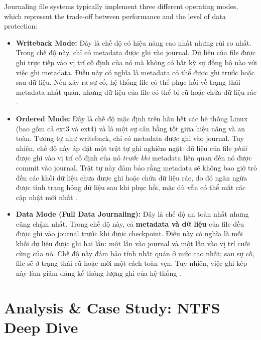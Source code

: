 \documentclass[12pt]{article}
\begin{document}
Journaling file systems typically implement three different operating modes, which represent the trade-off between performance and the level of data protection:

\begin{itemize}
    \item \textbf{Writeback Mode:} Đây là chế độ có hiệu năng cao nhất nhưng rủi ro nhất. Trong chế độ này, chỉ có metadata được ghi vào journal. Dữ liệu của file được ghi trực tiếp vào vị trí cố định của nó mà không có bất kỳ sự đồng bộ nào với việc ghi metadata. Điều này có nghĩa là metadata có thể được ghi trước hoặc sau dữ liệu. Nếu xảy ra sự cố, hệ thống file có thể phục hồi về trạng thái metadata nhất quán, nhưng dữ liệu của file có thể bị cũ hoặc chứa dữ liệu rác \parencite{Jones2008Anatomy}.

    \item \textbf{Ordered Mode:} Đây là chế độ mặc định trên hầu hết các hệ thống Linux (bao gồm cả ext3 và ext4) và là một sự cân bằng tốt giữa hiệu năng và an toàn. Tương tự như writeback, chỉ có metadata được ghi vào journal. Tuy nhiên, chế độ này áp đặt một trật tự ghi nghiêm ngặt: dữ liệu của file \textit{phải} được ghi vào vị trí cố định của nó \textit{trước khi} metadata liên quan đến nó được commit vào journal. Trật tự này đảm bảo rằng metadata sẽ không bao giờ trỏ đến các khối dữ liệu chưa được ghi hoặc chứa dữ liệu rác, do đó ngăn ngừa được tình trạng hỏng dữ liệu sau khi phục hồi, mặc dù vẫn có thể mất các cập nhật mới nhất \parencite{Prabhakaran2005journaling}.

    \item \textbf{Data Mode (Full Data Journaling):} Đây là chế độ an toàn nhất nhưng cũng chậm nhất. Trong chế độ này, cả \textbf{metadata và dữ liệu} của file đều được ghi vào journal trước khi được checkpoint. Điều này có nghĩa là mỗi khối dữ liệu được ghi hai lần: một lần vào journal và một lần vào vị trí cuối cùng của nó. Chế độ này đảm bảo tính nhất quán ở mức cao nhất; sau sự cố, file sẽ ở trạng thái cũ hoặc mới một cách toàn vẹn. Tuy nhiên, việc ghi kép này làm giảm đáng kể thông lượng ghi của hệ thống \parencite{Jones2008Anatomy}.
\end{itemize}




\section{Analysis \& Case Study: NTFS Deep Dive}
\end{document}
